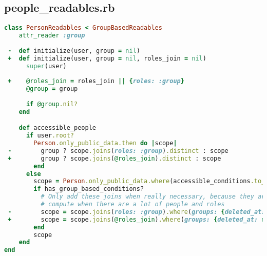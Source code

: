 \newpage

\subsection{people\_readables.rb}
\begin{lstlisting}[language=Ruby]
class PersonReadables < GroupBasedReadables
    attr_reader :group
  
 -  def initialize(user, group = nil)
 +  def initialize(user, group = nil, roles_join = nil)
      super(user)
  
 +    @roles_join = roles_join || {roles: :group}
      @group = group
  
      if @group.nil?
    end

    def accessible_people
      if user.root?
        Person.only_public_data.then do |scope|
 -        group ? scope.joins(roles: :group).distinct : scope
 +        group ? scope.joins(@roles_join).distinct : scope
        end
      else
        scope = Person.only_public_data.where(accessible_conditions.to_a).distinct
        if has_group_based_conditions?
          # Only add these joins when really necessary, because they are extremely expensive to
          # compute when there are a lot of people and roles
 -        scope = scope.joins(roles: :group).where(groups: {deleted_at: nil})
 +        scope = scope.joins(@roles_join).where(groups: {deleted_at: nil})
        end
        scope
    end
end    
\end{lstlisting}

\newpage

